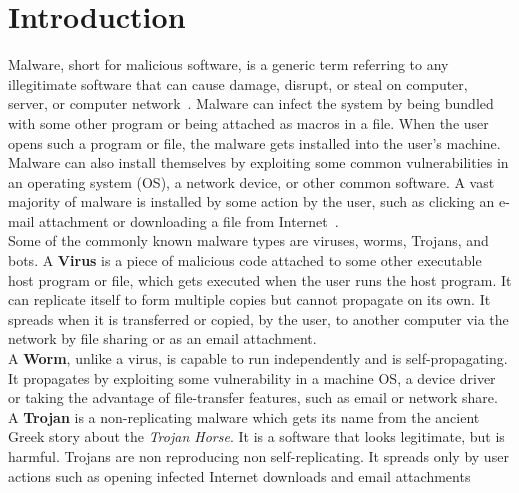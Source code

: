 \chapter{Introduction}\label{chapter:introduction}
Malware, short for malicious software, is a generic term referring to any illegitimate software that can cause damage, disrupt, or steal on computer, server, or computer network~\cite[]{ciscodif}.
Malware can infect the system by being bundled with some other program or being attached as macros in a file.
When the user opens such a program or file, the malware gets installed into the user's machine.
Malware can also install themselves by exploiting some common vulnerabilities in an operating system (OS), a network device, or other common software.
A vast majority of malware is installed by some action by the user, such as clicking an e-mail attachment or downloading a file from Internet~\cite[]{ciscodif}.\\
Some of the commonly known malware types are viruses, worms, Trojans, and bots.
A \textbf{Virus} is a piece of malicious code attached to some other executable host program or file, which gets executed when the user runs the host program.
It can replicate itself to form multiple copies but cannot propagate on its own.
It spreads when it is transferred or copied, by the user, to another computer via the network by file sharing or as an email attachment.\\
A \textbf{Worm}, unlike a virus, is capable to run independently and is self-propagating.
It propagates by exploiting some vulnerability in a machine OS, a device driver or taking the advantage of file-transfer features, such as email or network share.\\
A \textbf{Trojan} is a non-replicating malware which gets its name from the ancient Greek story about the \textit{Trojan Horse}.
It is a software that looks legitimate, but is harmful.
Trojans are non reproducing non self-replicating.
It spreads only by user actions such as opening infected Internet downloads and email attachments~\cite[]{ciscodif} \\
